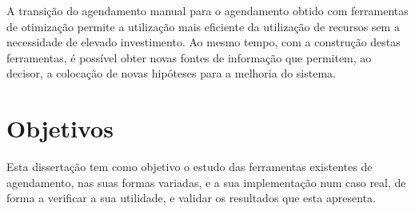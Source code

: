 A transição do agendamento manual para o agendamento obtido com ferramentas de otimização permite a utilização mais eficiente da utilização de recursos sem a necessidade de elevado investimento. Ao mesmo tempo, com a construção destas ferramentas, é possível obter novas fontes de informação que permitem, ao decisor, a colocação de novas hipóteses para a melhoria do sistema.\\


\section{Objetivos}
\label{sec:objetivos}

Esta dissertação tem como objetivo o estudo das ferramentas existentes de agendamento, nas suas formas variadas, e a sua implementação num caso real, de forma a verificar a sua utilidade, e validar os resultados que esta apresenta.